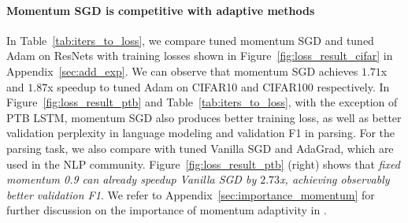 \paragraph{Momentum SGD is competitive with adaptive methods}
In Table~\ref{tab:iters_to_loss}, we compare tuned momentum SGD and tuned Adam on ResNets with training losses shown in Figure~\ref{fig:loss_result_cifar} in Appendix~\ref{sec:add_exp}. We can observe that momentum SGD
achieves $1.71$x and $1.87$x speedup to tuned Adam on CIFAR10 and CIFAR100 respectively. In Figure~\ref{fig:loss_result_ptb} and Table~\ref{tab:iters_to_loss}, 
with the exception of PTB LSTM, momentum SGD also produces better training loss, as well as better validation perplexity in language modeling and validation F1 in parsing.
For the parsing task, we also compare with tuned Vanilla SGD and AdaGrad, which are used in the NLP community.
Figure~\ref{fig:loss_result_ptb} (right) shows that \emph{fixed momentum 0.9 can already speedup Vanilla SGD by $2.73$x, achieving observably better validation F1}. %
 We refer to Appendix~\ref{sec:importance_momentum} for further discussion on the importance of momentum adaptivity in \tuner.



